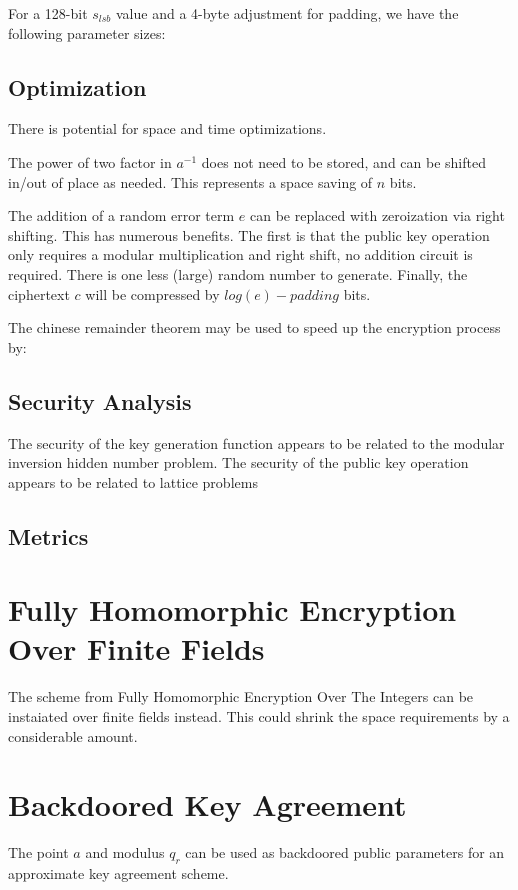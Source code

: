 \documentclass[preprint]{iacrtrans}
\begin{document}
For a 128-bit $s_{lsb}$ value and a 4-byte adjustment for padding, we have the following parameter sizes:


\subsection{Optimization}
There is potential for space and time optimizations.

The power of two factor in $a^{-1}$ does not need to be stored, and can be shifted in/out of place as needed. This represents a space saving of $n$ bits.

The addition of a random error term $e$ can be replaced with zeroization via right shifting. This has numerous benefits. The first is that the public key operation only requires a modular multiplication and right shift, no addition circuit is required. There is one less (large) random number to generate. Finally, the ciphertext $c$ will be compressed by $log(e) - padding$ bits.

The chinese remainder theorem may be used to speed up the encryption process by: 

\subsection{Security Analysis}
The security of the key generation function appears to be related to the modular inversion hidden number problem.
The security of the public key operation appears to be related to lattice problems
\todo{}

\subsection{Metrics}
\todo{}

\section{Fully Homomorphic Encryption Over Finite Fields}
The scheme from Fully Homomorphic Encryption Over The Integers can be instaiated over finite fields instead. This could shrink the space requirements by a considerable amount.


\section{Backdoored Key Agreement}
The point $a$ and modulus $q_r$ can be used as backdoored public parameters for an approximate key agreement scheme.
\end{document}
